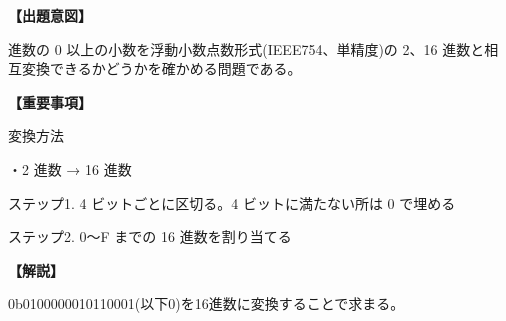 \noindent \textbf{【出題意図】}

 進数の 0 以上の小数を浮動小数点数形式(IEEE754、単精度)の 2、16 進数と相互変換できるかどうかを確かめる問題である。

\vspace{1em}
\noindent \textbf{【重要事項】}

\noindent 変換方法

\medskip
\noindent ・2 進数 → 16 進数

\noindent ステップ1.  4 ビットごとに区切る。4 ビットに満たない所は 0 で埋める

\noindent ステップ2.  0〜F までの 16 進数を割り当てる


\vspace{1em}
\noindent \textbf{【解説】}

\noindent 0b0100000010110001(以下0)を16進数に変換することで求まる。
